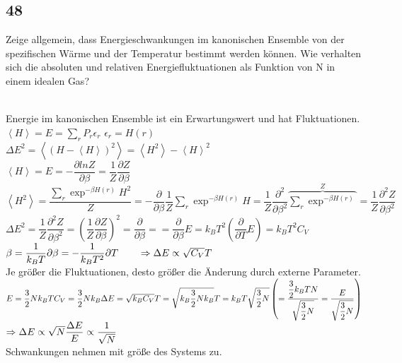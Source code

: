 \subsection{48}
\begin{myfrag}
Zeige allgemein, dass Energieschwankungen im kanonischen Ensemble von der
spezifischen Wärme und der Temperatur bestimmt werden können. Wie verhalten
sich die absoluten und relativen Energiefluktuationen als Funktion von N in einem
idealen Gas?
\end{myfrag} \quad \\
Energie im kanonischen Ensemble ist ein Erwartungswert und hat Fluktuationen. \\[1.5ex]
$ \left\langle H \right\rangle = E = \sum \limits _r P_r \epsilon _r$ \qquad $ \epsilon _r = H(r)$ 
\\[1ex]
$\Delta E^2 = \left\langle (H-\left\langle H\right\rangle )^2\right\rangle = \left\langle H^2\right\rangle -\left\langle H\right\rangle^2$
\\[1ex]
$ \left\langle H \right\rangle = E = -\dfrac{\partial ln Z}{\partial \beta } = \dfrac{1}{Z} \dfrac{\partial Z}{\partial \beta}$
\\[1ex]
$ \left\langle H^2 \right\rangle = \dfrac{\sum \limits_r \exp ^{-\beta H(r)}H^2}{Z} = - \dfrac{\partial }{\partial \beta} \dfrac{1}{Z} \sum \limits_r \exp ^{-\beta H(r)} H = \dfrac{1}{Z}\dfrac{\partial ^2}{\partial \beta ^2} \overbrace{\sum \limits _r \exp ^{-\beta H(r)}}^Z = \dfrac{1}{Z}\dfrac{\partial ^2 Z}{\partial \beta ^2}$
\\[1ex]
$\Delta E^2 = \dfrac{1}{Z} \dfrac{\partial ^2 Z}{\partial \beta ^2} = \left( \dfrac{1}{Z}\dfrac{\partial Z}{\partial \beta} \right)^2 = \dfrac{\partial }{\partial \beta}= = \dfrac{\partial}{\partial \beta}E=k_BT^2\left( \dfrac{\partial}{\partial T}E \right)= k_BT^2C_V$
\\[1ex]
$\beta = \dfrac{1}{k_BT} 
\\[1ex]
\partial \beta = - \dfrac{1}{k_BT^2}\partial T\qquad \Rightarrow \Delta E \propto \sqrt{C_V}T$ \\ Je größer die Fluktuationen, desto größer die Änderung durch externe Parameter.
\\[2ex]
$E=\dfrac{3}{2}Nk_BT \\[1ex]
C_V = \dfrac{3}{2} Nk_B \\[1ex]
\Delta E = \sqrt{k_BC_V}T= \sqrt{k_B\dfrac{3}{2}Nk_B}T=k_BT\sqrt{\dfrac{3}{2}N}\left( = \dfrac{\dfrac{3}{2}k_BTN}{\sqrt{\dfrac{3}{2}N}}=\dfrac{E}{\sqrt{\dfrac{3}{2}N}}\right)$ \\[1ex]
$\Rightarrow \Delta E \propto \sqrt{N}\\[1ex]
\dfrac{\Delta E}{E} \propto \dfrac{1}{\sqrt{N}}$\\Schwankungen nehmen mit größe des Systems zu.
